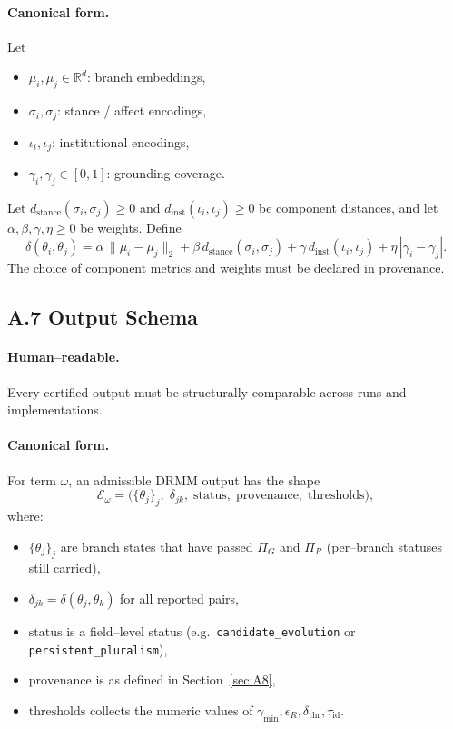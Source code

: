 \documentclass[11pt, a4paper]{article}
\begin{document}
\paragraph{Canonical form.}
Let
\begin{itemize}
  \item $\mu_i,\mu_j \in \mathbb{R}^d$: branch embeddings,
  \item $\sigma_i,\sigma_j$: stance / affect encodings,
  \item $\iota_i,\iota_j$: institutional encodings,
  \item $\gamma_i,\gamma_j \in [0,1]$: grounding coverage.
\end{itemize}

Let $d_{\mathrm{stance}}(\sigma_i,\sigma_j) \ge 0$ and $d_{\mathrm{inst}}(\iota_i,\iota_j) \ge 0$ be component distances, and let $\alpha,\beta,\gamma,\eta \ge 0$ be weights. Define
\[
\delta(\theta_i,\theta_j)
=
\alpha \,\lVert \mu_i-\mu_j \rVert_2
+
\beta \, d_{\mathrm{stance}}(\sigma_i,\sigma_j)
+
\gamma \, d_{\mathrm{inst}}(\iota_i,\iota_j)
+
\eta \, |\gamma_i-\gamma_j|.
\]
The choice of component metrics and weights must be declared in provenance.

\subsection*{A.7 \quad Output Schema}

\paragraph{Human–readable.}
Every certified output must be structurally comparable across runs and implementations.

\paragraph{Canonical form.}
For term $\omega$, an admissible DRMM output has the shape
\[
\mathcal{E}_\omega = 
\bigl(
\{\theta_j\}_j,\;
\delta_{jk},\;
\mathrm{status},\;
\mathrm{provenance},\;
\mathrm{thresholds}
\bigr),
\]
where:
\begin{itemize}
  \item $\{\theta_j\}_j$ are branch states that have passed $\Pi_G$ and $\Pi_R$ (per–branch statuses still carried),
  \item $\delta_{jk} = \delta(\theta_j,\theta_k)$ for all reported pairs,
  \item $\mathrm{status}$ is a field–level status (e.g.\ \texttt{candidate\_evolution} or \texttt{persistent\_pluralism}),
  \item $\mathrm{provenance}$ is as defined in Section~\ref{sec:A8},
  \item $\mathrm{thresholds}$ collects the numeric values of $\gamma_{\min}, \epsilon_R, \delta_{\mathrm{thr}}, \tau_{\mathrm{id}}$.
\end{itemize}
\end{document}
